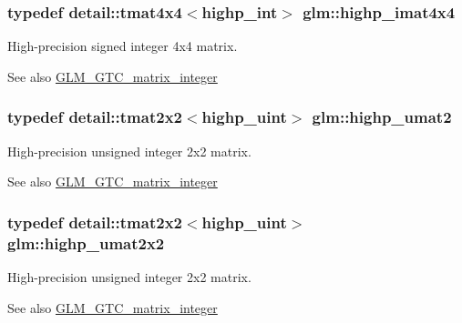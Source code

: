 \subsubsection[{highp\+\_\+imat4x4}]{\setlength{\rightskip}{0pt plus 5cm}typedef detail\+::tmat4x4$<$highp\+\_\+int$>$ {\bf glm\+::highp\+\_\+imat4x4}}\label{group__gtc__matrix__integer_gaff23c95b5feea2b2352b377810783823}
High-\/precision signed integer 4x4 matrix. \begin{DoxySeeAlso}{See also}
\hyperlink{group__gtc__matrix__integer}{G\+L\+M\+\_\+\+G\+T\+C\+\_\+matrix\+\_\+integer} 
\end{DoxySeeAlso}
\hypertarget{group__gtc__matrix__integer_ga65158bd3fa138afe2c389a8e50e22c27}{}
\subsubsection[{highp\+\_\+umat2}]{\setlength{\rightskip}{0pt plus 5cm}typedef detail\+::tmat2x2$<$highp\+\_\+uint$>$ {\bf glm\+::highp\+\_\+umat2}}\label{group__gtc__matrix__integer_ga65158bd3fa138afe2c389a8e50e22c27}
High-\/precision unsigned integer 2x2 matrix. \begin{DoxySeeAlso}{See also}
\hyperlink{group__gtc__matrix__integer}{G\+L\+M\+\_\+\+G\+T\+C\+\_\+matrix\+\_\+integer} 
\end{DoxySeeAlso}
\hypertarget{group__gtc__matrix__integer_ga3d03c649a79dcf3c8b3f766e1c5e7870}{}
\subsubsection[{highp\+\_\+umat2x2}]{\setlength{\rightskip}{0pt plus 5cm}typedef detail\+::tmat2x2$<$highp\+\_\+uint$>$ {\bf glm\+::highp\+\_\+umat2x2}}\label{group__gtc__matrix__integer_ga3d03c649a79dcf3c8b3f766e1c5e7870}
High-\/precision unsigned integer 2x2 matrix. \begin{DoxySeeAlso}{See also}
\hyperlink{group__gtc__matrix__integer}{G\+L\+M\+\_\+\+G\+T\+C\+\_\+matrix\+\_\+integer} 
\end{DoxySeeAlso}
\hypertarget{group__gtc__matrix__integer_ga423c173624bfed5e27073987eecf06c2}{}
